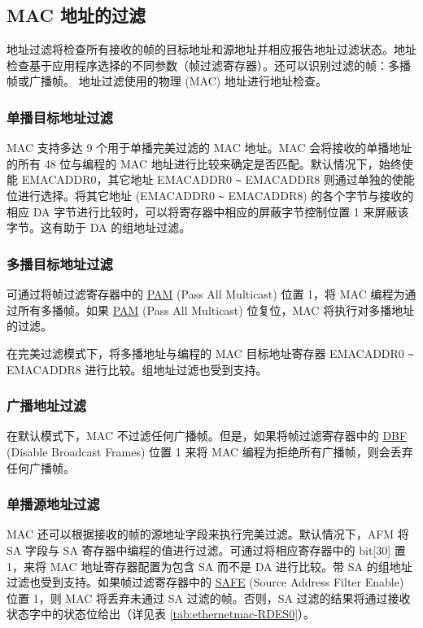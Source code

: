 \documentclass[main\_\_CN.tex]{subfiles}
\begin{document}
\subsection{MAC 地址的过滤}
地址过滤将检查所有接收的帧的目标地址和源地址并相应报告地址过滤状态。地址检查基于应用程序选择的不同参数（帧过滤寄存器）。还可以识别过滤的帧：多播帧或广播帧。
地址过滤使用的物理 (MAC) 地址进行地址检查。

\subsubsection{单播目标地址过滤 }
MAC 支持多达 9 个用于单播完美过滤的 MAC 地址。MAC 会将接收的单播地址的所有 48 位与编程的 MAC 地址进行比较来确定是否匹配。默认情况下，始终使能 EMACADDR0，其它地址 EMACADDR0 \verb+~+ EMACADDR8 则通过单独的使能位进行选择。将其它地址 (EMACADDR0 \verb+~+ EMACADDR8) 的各个字节与接收的相应 DA 字节进行比较时，可以将寄存器中相应的屏蔽字节控制位置 1 来屏蔽该字节。这有助于 DA 的组地址过滤。

\subsubsection{多播目标地址过滤 }
可通过将帧过滤寄存器中的 \hyperref[regdesc:EMACFFREG]{PAM} (Pass All Multicast) 位置 1，将 MAC 编程为通过所有多播帧。如果 \hyperref[regdesc:EMACFFREG]{PAM} (Pass All Multicast) 位复位，MAC 将执行对多播地址的过滤。

在完美过滤模式下，将多播地址与编程的 MAC 目标地址寄存器 EMACADDR0 \verb+~+ EMACADDR8 进行比较。组地址过滤也受到支持。

\subsubsection{广播地址过滤 }
在默认模式下，MAC 不过滤任何广播帧。但是，如果将帧过滤寄存器中的 \hyperref[regdesc:EMACFFREG]{DBF} (Disable Broadcast Frames) 位置 1 来将 MAC 编程为拒绝所有广播帧，则会丢弃任何广播帧。

\subsubsection{单播源地址过滤 }
MAC 还可以根据接收的帧的源地址字段来执行完美过滤。默认情况下，AFM 将 SA 字段与 SA 寄存器中编程的值进行过滤。可通过将相应寄存器中的 bit[30] 置 1，来将 MAC 地址寄存器配置为包含 SA 而不是 DA 进行比较。带 SA 的组地址过滤也受到支持。如果帧过滤寄存器中的 \hyperref[regdesc:EMACFFREG]{SAFE} (Source Address Filter Enable) 位置 1，则 MAC 将丢弃未通过 SA 过滤的帧。否则，SA 过滤的结果将通过接收状态字中的状态位给出（详见表 \ref{tab:ethernetmac-RDES0}）。
\end{document}
